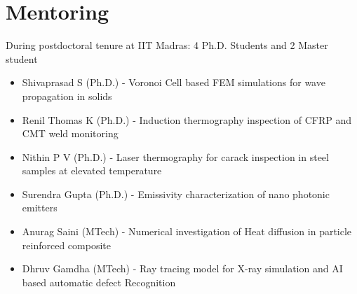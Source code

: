 \documentclass{my_cv}%
\begin{document}
\section{Mentoring}
\vspace{1em}
\noindent \faEye \hspace{1em} \color{mygray} During postdoctoral tenure at IIT Madras: 4 Ph.D. Students and 2 Master student 
\begin{itemize}[leftmargin=0.15in]
\setlength\itemsep{-0.1em}
\color{mygray}
\item Shivaprasad S (Ph.D.) - Voronoi Cell based FEM simulations for wave propagation in solids
\item Renil Thomas K (Ph.D.) - Induction thermography inspection of CFRP and CMT weld monitoring  
\item Nithin P V (Ph.D.) - Laser thermography for carack inspection in steel samples at elevated temperature
\item Surendra Gupta (Ph.D.) - Emissivity characterization of nano photonic emitters 
\item Anurag Saini (MTech) - Numerical investigation of Heat diffusion in particle reinforced composite
\item Dhruv Gamdha (MTech) - Ray tracing model for X-ray simulation and AI based automatic defect Recognition 
\end{itemize}
\end{document}
